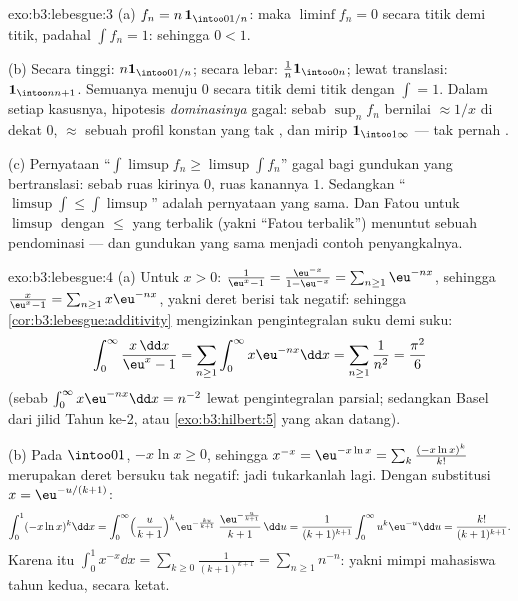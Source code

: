 \begin{solution}{exo:b3:lebesgue:3}
(a) $f_n = n\,\mathbf 1_{\intoo0{1/n}}$: maka $\liminf f_n = 0$
secara titik demi titik, padahal $\int f_n = 1$: sehingga $0 < 1$.

(b) Secara tinggi: $n\mathbf 1_{\intoo0{1/n}}$; secara lebar: $\frac1n\mathbf
1_{\intoo0n}$; lewat translasi: $\mathbf 1_{\intoo n{n+1}}$. Semuanya
menuju $0$ secara titik demi titik dengan $\int = 1$. Dalam setiap kasusnya, hipotesis
\emph{dominasinya} gagal: sebab $\sup_nf_n$ bernilai
$\approx 1/x$ di dekat $0$, $\approx$ sebuah profil konstan yang tak
, dan mirip $\mathbf 1_{\intoo1\infty}$ --- tak pernah .

(c) Pernyataan ``$\int\limsup f_n \geq \limsup\int f_n$'' gagal bagi
gundukan yang bertranslasi: sebab ruas kirinya $0$, ruas kanannya $1$.
Sedangkan ``$\limsup\int \leq \int\limsup$'' adalah pernyataan yang sama. Dan
Fatou untuk $\limsup$ dengan $\leq$ yang terbalik
(yakni ``Fatou terbalik'') menuntut sebuah pendominasi --- dan gundukan yang sama
menjadi contoh penyangkalnya.
\end{solution}

\begin{solution}{exo:b3:lebesgue:4}
(a) Untuk $x > 0$: $\frac1{\eu^x - 1} = \frac{\eu^{-x}}{1 -
\eu^{-x}} = \sum_{n\geq1}\eu^{-nx}$, sehingga $\frac{x}{\eu^x - 1} =
\sum_{n\geq1}x\eu^{-nx}$, yakni deret berisi  tak
negatif: sehingga \cref{cor:b3:lebesgue:additivity} mengizinkan pengintegralan
suku demi suku:
\[
\int_0^\infty\frac{x\,\dd x}{\eu^x - 1}
= \sum_{n\geq1}\int_0^\infty x\eu^{-nx}\dd x
= \sum_{n\geq1}\frac1{n^2} = \frac{\pi^2}6
\]
(sebab $\int_0^\infty x\eu^{-nx}\dd x = n^{-2}$ lewat pengintegralan parsial; sedangkan Basel dari
jilid Tahun ke-2, atau \cref{exo:b3:hilbert:5} yang akan datang).

(b) Pada $\intoo01$, $-x\ln x \geq 0$, sehingga $x^{-x} =
\eu^{-x\ln x} = \sum_k\frac{(-x\ln x)^k}{k!}$ merupakan deret
bersuku tak negatif: jadi tukarkanlah lagi. Dengan substitusi $x =
\eu^{-u/(k+1)}$:
\[
\int_0^1(-x\ln x)^k\dd x
= \int_0^\infty\Bigl(\frac{u}{k+1}\Bigr)^{k}
\eu^{-\frac{ku}{k+1}}\;\frac{\eu^{-\frac u{k+1}}}{k+1}\,\dd u
= \frac{1}{(k+1)^{k+1}}\int_0^\infty u^k\eu^{-u}\dd u
= \frac{k!}{(k+1)^{k+1}} .
\]
Karena itu $\int_0^1x^{-x}\dd x = \sum_{k\geq0}\frac{1}{(k+1)^{k+1}}
= \sum_{n\geq1}n^{-n}$: yakni mimpi mahasiswa tahun kedua, secara ketat.
\end{solution}

